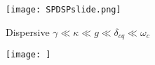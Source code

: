 \documentclass{beamer}
\begin{document}
\begin{frame}
    \texttt{[image: SPDSPslide.png]}
\end{frame}
\begin{frame}
    \begin{block}{Dispersive}
            $\gamma \ll \kappa \ll g \ll \delta_{cq} \ll \omega_c$
    \end{block}
\end{frame}
\begin{frame}
    \texttt{[image: ]}
\end{frame}
\printbibliography\
\end{document}
